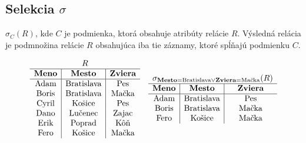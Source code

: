 \subsection*{\textbf{Selekcia $\sigma$}} $\sigma_C(R)$, kde $C$ je podmienka, ktorá obsahuje
atribúty relácie $R$. Výsledná relácia je podmnožina relácie $R$ obsahujúca iba tie záznamy, ktoré
spĺňajú podmienku $C$.
    \begin{priklad}
    \begin{center}
        \[
        \begin{array}{c c}
            \begin{array}{c|c|c}
            \multicolumn{3}{c}{R} \\ \hline
            \textbf{Meno} & \textbf{Mesto}    & \textbf{Zviera} \\ \hline
            \text{Adam}   & \text{Bratislava} & \text{Pes} \\
            \text{Boris}  & \text{Bratislava} & \text{Mačka} \\
            \text{Cyril}  & \text{Košice}     & \text{Pes} \\
            \text{Dano}   & \text{Lučenec}    & \text{Zajac} \\
            \text{Erik}   & \text{Poprad}     & \text{Kôň} \\
            \text{Fero}   & \text{Košice}     & \text{Mačka} \\
            \end{array}
            &
            \begin{array}{c|c|c}
            \multicolumn{3}{c}{\sigma_{\textbf{Mesto} = \text{Bratislava} \lor \textbf{Zviera} = \text{Mačka}}(R)} \\ \hline
            \textbf{Meno} & \textbf{Mesto}    & \textbf{Zviera} \\ \hline
            \text{Adam}   & \text{Bratislava} & \text{Pes} \\
            \text{Boris}  & \text{Bratislava} & \text{Mačka} \\
            \text{Fero}   & \text{Košice}     & \text{Mačka} \\
            \end{array}
        \end{array}
        \]
    \end{center}
    \end{priklad}
    
